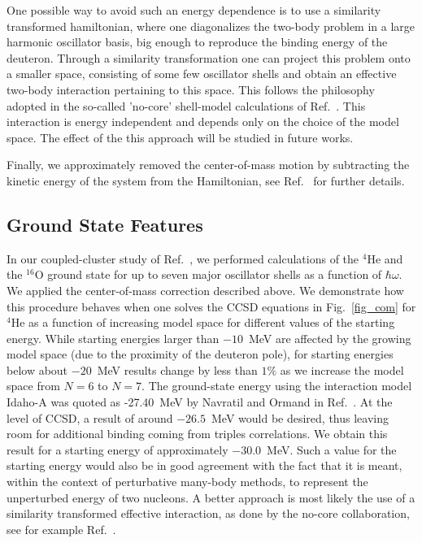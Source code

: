 \documentclass[fleqn,12pt,twoside]{article}
\begin{document}
One possible way to avoid such an energy dependence is to use a similarity transformed 
hamiltonian, where one diagonalizes the two-body problem in a large harmonic oscillator 
basis, big enough to reproduce the binding energy of the deuteron. 
Through a similarity transformation one can project this problem onto a smaller space,
consisting of some few oscillator shells and obtain an effective two-body 
interaction pertaining to this space. This follows the philosophy adopted in the 
so-called 'no-core' shell-model calculations of Ref.~\cite{bruce3}. 
This interaction is energy independent and depends only on the choice of the model 
space. The effect of the this approach will be studied in future works.

Finally, 
we approximately removed the center-of-mass motion by
subtracting the kinetic energy of the system from the Hamiltonian, 
see Ref.~\cite{ref1} for further details.


\subsection{Ground State Features}


In our coupled-cluster study of Ref.~\cite{ref1}, 
we performed calculations of the $^{4}$He
and the $^{16}$O ground state for up to seven major oscillator 
shells as a function of $\hbar\omega$. 
We applied the center-of-mass correction described above. 
We demonstrate 
how this procedure behaves when one solves the CCSD equations in
Fig.~\ref{fig_com} for $^{4}$He as a function of increasing 
model space for different values of the starting energy. While 
starting energies larger than $-10$~MeV are affected by the 
growing model space (due to the proximity of the deuteron pole), for
starting energies below about $-20$~MeV results change by less than
$1\%$ as we increase the model space from $N=6$ to $N=7$. 
The ground-state energy using
the interaction model Idaho-A was quoted as -27.40~MeV by Navratil and Ormand in
Ref.~\cite{petr_erich2002}. At the level of CCSD, a result of around $-26.5$~MeV
would be desired, thus leaving room for additional binding coming
from triples correlations. We obtain this result for a
starting energy of approximately $-30.0$~MeV. 
Such a value for the 
starting energy would also be in good agreement with the fact that it is
meant, within the context  of perturbative many-body methods, to represent
the unperturbed energy of two nucleons. 
A better approach is most likely the use of a similarity transformed 
effective interaction, as done by the no-core collaboration, see for example
Ref.~\cite{bruce3}.
\end{document}
